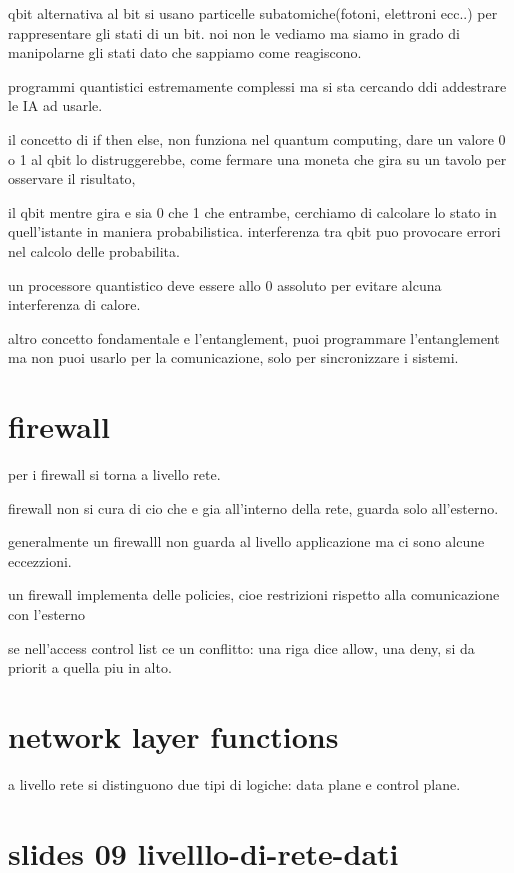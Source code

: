 \documentclass[12pt]{article}
\begin{document}
qbit alternativa al bit
si usano particelle subatomiche(fotoni, elettroni ecc..) per rappresentare gli stati di un bit. noi non le vediamo ma siamo in grado di manipolarne gli stati dato che sappiamo come reagiscono.

programmi quantistici estremamente complessi ma si sta cercando ddi addestrare le IA ad usarle.

il concetto di if then else, non funziona nel quantum computing, dare un valore 0 o 1 al qbit lo distruggerebbe, come fermare una moneta che gira su un tavolo per osservare il risultato,

il qbit mentre gira e sia 0 che 1 che entrambe, cerchiamo di calcolare lo stato in quell'istante in maniera probabilistica. interferenza tra qbit puo provocare errori nel calcolo delle probabilita.

un processore quantistico deve essere allo 0 assoluto per evitare alcuna interferenza di calore.

altro concetto fondamentale e l'entanglement, puoi programmare l'entanglement ma non puoi usarlo per la comunicazione, solo per sincronizzare i sistemi.

\section{firewall}
 
per i firewall si torna a livello rete.

firewall non si cura di cio che e gia all'interno della rete, guarda solo all'esterno.

generalmente un firewalll non guarda al livello applicazione ma ci sono alcune eccezzioni.

un firewall implementa delle policies, cioe restrizioni rispetto alla comunicazione con l'esterno

se nell'access control list ce un conflitto: una riga dice allow, una deny, si da priorit a quella piu in alto.

\section{network layer functions}

a livello rete si distinguono due tipi di logiche: data plane e control plane.

\section{slides 09 livelllo-di-rete-dati}
\end{document}
